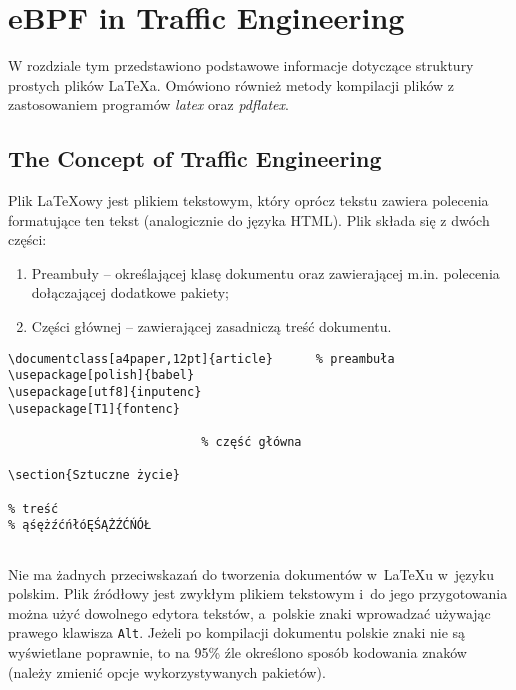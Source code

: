 \chapter{eBPF in Traffic Engineering}
\label{cha:ebpf}

W rozdziale tym przedstawiono podstawowe informacje dotyczące struktury prostych plików \LaTeX a. Omówiono również metody kompilacji plików z zastosowaniem programów \emph{latex} oraz \emph{pdflatex}.


\section{The Concept of Traffic Engineering}
\label{sec:traffic_concept}

Plik \LaTeX owy jest plikiem tekstowym, który oprócz tekstu zawiera polecenia formatujące ten tekst (analogicznie do języka HTML). Plik składa się z dwóch części:
\begin{enumerate}%
\item Preambuły -- określającej klasę dokumentu oraz zawierającej m.in. polecenia dołączającej dodatkowe pakiety;

\item Części głównej -- zawierającej zasadniczą treść dokumentu.
\end{enumerate}


\begin{lstlisting}
\documentclass[a4paper,12pt]{article}      % preambuła
\usepackage[polish]{babel}
\usepackage[utf8]{inputenc}
\usepackage[T1]{fontenc}

                           % część główna

\section{Sztuczne życie}

% treść
% ąśężźćńłóĘŚĄŻŹĆŃÓŁ


\end{lstlisting}

Nie ma żadnych przeciwskazań do tworzenia dokumentów w~\LaTeX u w~języku polskim. Plik źródłowy jest zwykłym plikiem tekstowym i~do jego przygotowania można użyć dowolnego edytora tekstów, a~polskie znaki wprowadzać używając prawego klawisza \texttt{Alt}. Jeżeli po kompilacji dokumentu polskie znaki nie są wyświetlane poprawnie, to na 95\% źle określono sposób kodowania znaków (należy zmienić opcje wykorzystywanych pakietów).


